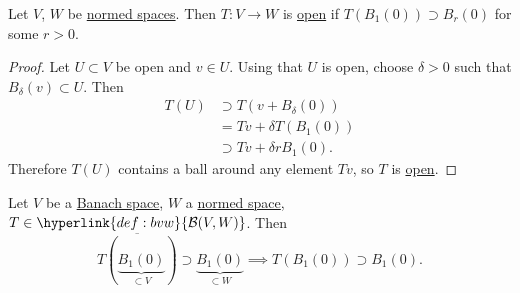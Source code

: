 \documentclass{article}
\begin{document}
\begin{lemma}
    Let $V$, $W$ be \hyperlink{def:nvs}{normed spaces}.
    Then $T: V \to W$ is \hyperlink{def:openMap}{open} if $T(B_1(0)) \supset B_r(0)$ for some $r > 0$.
\end{lemma}

\begin{proof}
    Let $U \subset V$ be open and $v \in U$. Using that $U$ is open, choose $\delta > 0$ such that $B_\delta(v) \subset U$. Then
    \begin{align*}
        T(U) &\supset T(v + B_\delta(0)) \\
             &=Tv + \delta T(B_1(0)) \\
             &\supset T v + \delta r B_1(0).
    \end{align*}
    Therefore $T(U)$ contains a ball around any element $Tv$, so $T$ is \hyperlink{def:openMap}{open}.
\end{proof}

\begin{lemma}
    Let $V$ be a \hyperlink{def:banach}{Banach space}, $W$ a \hyperlink{def:nvs}{normed space}, $T \in \hyperlink{def:bvw}{\mathcal{B}(V, W)}$. Then
    \begin{equation*}
        \overline{T(\underbrace{B_1(0)}_{\subset V})} \supset \underbrace{B_1(0)}_{\subset W} \implies T(B_1(0)) \supset B_1(0).
    \end{equation*}
\end{lemma}
\end{document}
